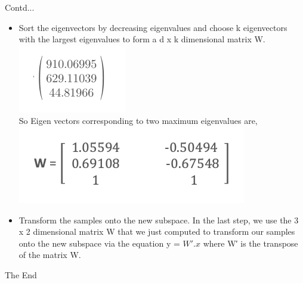 \documentclass{beamer}
\begin{document}
\begin{frame}{Contd...}
	\begin{itemize}
	\item Sort the eigenvectors by decreasing eigenvalues and choose k eigenvectors with the largest eigenvalues to form a d x k dimensional matrix W.\\
	\includegraphics[scale=0.5]{eigen_vec1}\\
	So Eigen vectors corresponding to two maximum eigenvalues are,
	\includegraphics[scale=0.4]{eigen_vec2}\\
	\item Transform the samples onto the new subspace.
	In the last step, we use the 3 x 2 dimensional matrix W that we just computed to transform our samples onto the new subspace via the equation y = $W' . x$ where W′ is the transpose of the matrix W.
	\end{itemize}
\end{frame}
\begin{frame}
\huge{\centerline{The End}}
\end{frame}
\end{document}
